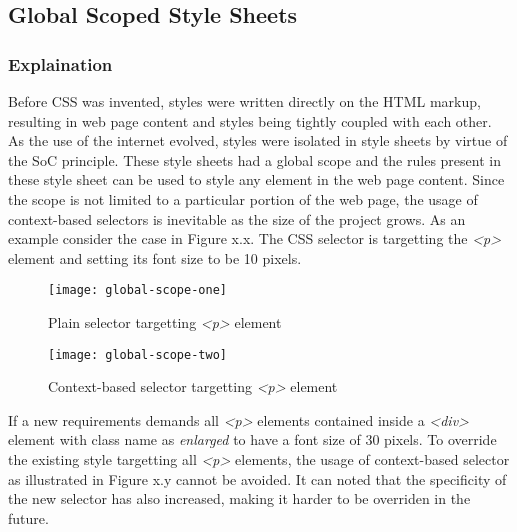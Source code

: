 \documentclass[12pt]{article}
\begin{document}
\subsection{Global Scoped Style Sheets}
\subsubsection{Explaination}
Before CSS was invented, styles were written directly on the HTML markup, resulting in web page content and styles being tightly coupled with each other. As the use of the internet evolved, styles were isolated in style sheets by virtue of the SoC principle. These style sheets had a global scope and the rules present in these style sheet can be used to style any element in the web page content. Since the scope is not limited to a particular portion of the web page, the usage of context-based selectors is inevitable as the size of the project grows. As an example consider the case in Figure x.x. The CSS selector is targetting the \textit{<p>} element and setting its font size to be 10 pixels.

\vspace{0.5cm}

\begin{figure}[h]
\texttt{[image: global-scope-one]}
\centering
\caption{Plain selector targetting \textit{<p>} element}
\end{figure}

\vspace{0.5cm}

\begin{figure}[h]
\texttt{[image: global-scope-two]}
\centering
\caption{Context-based selector targetting \textit{<p>} element}
\end{figure}

\vspace{0.5cm}

If a new requirements demands all \textit{<p>} elements contained inside a \textit{<div>} element with class name as \textit{enlarged} to have a font size of 30 pixels. To override the existing style targetting all \textit{<p>} elements, the usage of  context-based selector as illustrated in Figure x.y cannot be avoided. It can noted that the specificity of the new selector has also increased, making it harder to be overriden in the future. 

\end{document}
